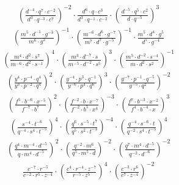 \begin{align}
\left(\frac{d^{-4}\cdot q^{7}\cdot c^{-2}}{d^{3}\cdot q^{-3}\cdot c^{7}}\right)^{-2}\cdot \frac{d^{6}\cdot q\cdot c^{3}}{d^{3}\cdot q^{-1}\cdot c^{-2}}\cdot \left(\frac{d^{-5}\cdot q^{5}\cdot c^{2}}{d\cdot q^{-5}}\right)^{3}
\end{align}
\begin{align}
\left(\frac{m^{5}\cdot d^{-1}\cdot g^{-3}}{m^{6}\cdot g^{2}}\right)^{-1}\cdot \left(\frac{m^{-6}\cdot d^{6}\cdot g^{-7}}{m^{7}\cdot d^{7}\cdot g^{-5}}\right)^{-1}\cdot \frac{m^{5}\cdot d^{4}\cdot g^{5}}{d^{5}\cdot g^{-4}}
\end{align}
\begin{align}
\left(\frac{m^{4}\cdot d^{2}\cdot s^{7}}{m^{-6}\cdot d^{2}\cdot s^{-1}}\right)^{4}\cdot \left(\frac{m^{3}\cdot d^{-7}\cdot s}{m^{-5}\cdot d^{-2}\cdot s^{5}}\right)^{3}\cdot \left(\frac{m^{5}\cdot d^{-2}\cdot s^{-4}}{m\cdot d^{2}\cdot s^{2}}\right)^{-1}
\end{align}
\begin{align}
\left(\frac{y^{4}\cdot p^{-4}\cdot q^{4}}{y^{3}\cdot p^{-2}\cdot q^{4}}\right)^{2}\cdot \left(\frac{y^{-4}\cdot p^{3}\cdot q^{-1}}{y^{-6}\cdot p^{4}\cdot q^{6}}\right)^{3}\cdot \left(\frac{y^{-7}\cdot p^{-1}\cdot q^{-5}}{y^{-5}\cdot q^{2}}\right)^{-2}
\end{align}
\begin{align}
\left(\frac{f^{5}\cdot b^{-6}\cdot x^{-5}}{f^{-7}\cdot b^{7}}\right)^{2}\cdot \left(\frac{f^{-2}\cdot b\cdot x^{-7}}{f^{-2}\cdot b^{5}\cdot x^{4}}\right)^{-3}\cdot \left(\frac{f^{7}\cdot b^{-3}\cdot x^{-2}}{f^{4}\cdot b^{-4}\cdot x}\right)^{3}
\end{align}
\begin{align}
\left(\frac{s^{-4}\cdot t^{-6}}{q^{-4}\cdot s^{4}\cdot t^{-5}}\right)^{4}\cdot \left(\frac{q^{6}\cdot s^{-5}\cdot t^{7}}{q^{5}\cdot s^{2}\cdot t^{-3}}\right)^{-4}\cdot \left(\frac{q^{-4}\cdot s^{-6}\cdot t}{q^{-2}\cdot s^{4}\cdot t^{-5}}\right)^{4}
\end{align}
\begin{align}
\left(\frac{q^{4}\cdot m^{-4}\cdot d^{-5}}{q\cdot m^{4}\cdot d^{-5}}\right)^{2}\cdot \left(\frac{q^{-2}\cdot m^{6}}{q^{5}\cdot m^{5}\cdot d}\right)^{-2}\cdot \left(\frac{q^{7}\cdot m^{4}\cdot d^{-5}}{q^{-2}\cdot d^{-6}}\right)^{-2}
\end{align}
\begin{align}
\frac{c^{-7}\cdot r^{-5}}{c^{-2}\cdot r^{5}\cdot z^{-4}}\cdot \left(\frac{c^{4}\cdot r^{-4}\cdot z^{-7}}{r^{-5}\cdot z^{5}}\right)^{4}\cdot \left(\frac{c^{-3}\cdot r^{6}}{c^{7}\cdot z^{-4}}\right)^{-2}
\end{align}
